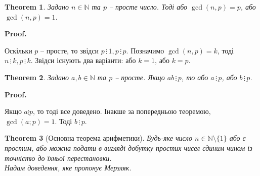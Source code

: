 \documentclass[a4paper, 10pt]{article}
\makeatletter
\def\qed{$\blacksquare$}
\theoremstyle{theoremdd}
\newtheorem{theorem}{Theorem}[subsection]
\theoremstyle{theoremdd}
\theoremstyle{theoremdd}
\theoremstyle{theoremdd}
\theoremstyle{theoremdd}
\theoremstyle{theoremdd}
\theoremstyle{theoremdd}
\theoremstyle{theoremdd}
\renewenvironment{proof}[1][Proof.\\]{\par
\pushQED{\hfill \qed}%
\normalfont \topsep6\p@\@plus6\p@\relax
\trivlist
\item\relax
{\bfseries
#1\@addpunct{.}}\hspace\labelsep\ignorespaces
}{%
\popQED\endtrivlist\@endpefalse
}
\newcommand\divisibleBy{\, \vdots \,}
\makeatother
\begin{document}
\begin{theorem}
Задано $n \in \mathbb{N}$ та $p$ -- просте число. Тоді або $\gcd(n,p) = p$, або $\gcd(n,p) = 1$.
\end{theorem}

\begin{proof}
Оскільки $p$ -- просте, то звідси $p \divisibleBy 1, p \divisibleBy p$. Позначимо $\gcd(n,p) = k$, тоді $n \divisibleBy k, p \divisibleBy k$. Звідси існують два варіанти: або $k = 1$, або $k = p$.
\end{proof}

\begin{theorem}
Задано $a,b \in \mathbb{N}$ та $p$ -- просте. Якщо $ab \divisibleBy p$, то або $a \divisibleBy p$, або $b \divisibleBy p$.
\end{theorem}

\begin{proof}
Якщо $a \vdots p$, то тоді все доведено. Інакше за попередньою теоремою, $\gcd(a;p) = 1$. Тоді $b \divisibleBy p$.
\end{proof}

\begin{theorem}[Основна теорема арифметики]
Будь-яке число $n \in \mathbb{N} \setminus \{1\}$ або є простим, або можна подати в вигляді добутку простих чисел єдиним чином із точністю до їхньої перестановки.\\
\textit{Надам доведення, яке пропонує Мерзляк.}
\end{theorem}
\end{document}
